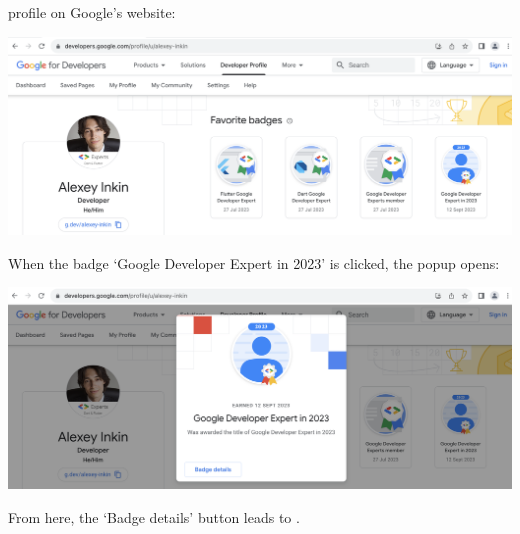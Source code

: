 
\mrls profile on Google's website:

\includegraphics[width=\textwidth]{badge-awarded-1}

\VerticalSpace

When the badge `Google Developer Expert in 2023' is clicked, the popup opens:

\includegraphics[width=\textwidth]{badge-awarded-2}

\VerticalSpace

From here, the `Badge details' button leads to .

\pagebreak
